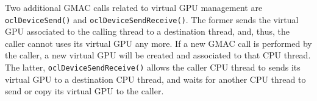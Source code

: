 Two additional GMAC calls related to virtual GPU management are \texttt{ocl\-Device\-Send()} and 
\texttt{ocl\-Device\-Send\-Receive()}. The former sends the virtual GPU associated to the calling 
thread to a destination thread, and, thus, the caller cannot uses its virtual GPU any more. If a new 
GMAC call is performed by the caller, a new virtual GPU will be created and associated to that CPU 
thread. The latter, \texttt{ocl\-Device\-Send\-Receive()} allows the caller CPU thread to sends its 
virtual GPU to a destination CPU thread, and waits for another CPU thread to send or copy its 
virtual GPU to the caller. 

